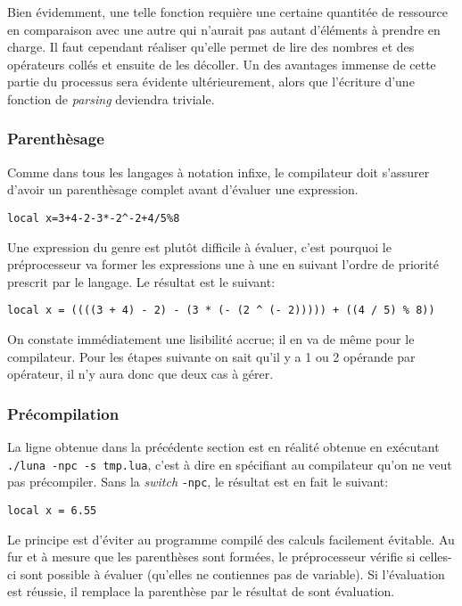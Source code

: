 \documentclass{article}
\begin{document}
Bien évidemment, une telle fonction requière une certaine quantitée de ressource en comparaison avec une autre qui n'aurait pas autant d'éléments à prendre en charge. Il faut cependant réaliser qu'elle permet de lire des nombres et des opérateurs collés et ensuite de les décoller. Un des avantages immense de cette partie du processus sera évidente ultérieurement, alors que l'écriture d'une fonction de \textit{parsing} deviendra triviale.

\subsubsection{Parenthèsage}
Comme dans tous les langages à notation infixe, le compilateur doit s'assurer d'avoir un parenthèsage complet avant d'évaluer une expression.
\begin{lstlisting}[caption={Parenthèsage incomplet},label=DescriptiveLabel]
  local x=3+4-2-3*-2^-2+4/5%8
\end{lstlisting}

Une expression du genre est plutôt difficile à évaluer, c'est pourquoi le préprocesseur va former les expressions une à une en suivant l'ordre de priorité prescrit par le langage. Le résultat est le suivant:
\begin{lstlisting}[belowcaptionskip = -1\baselineskip]
local x = ((((3 + 4) - 2) - (3 * (- (2 ^ (- 2))))) + ((4 / 5) % 8))
\end{lstlisting}

On constate immédiatement une lisibilité accrue; il en va de même pour le compilateur. Pour les étapes suivante on sait qu'il y a 1 ou 2 opérande par opérateur, il n'y aura donc que deux cas à gérer.
\subsubsection{Précompilation}
La ligne obtenue dans la précédente section est en réalité obtenue en exécutant \texttt{./luna -npc -s tmp.lua}, c'est à dire en spécifiant au compilateur qu'on ne veut pas précompiler. Sans la \textit{switch} \texttt{-npc}, le résultat est en fait le suivant:
\begin{lstlisting}[belowcaptionskip = -1\baselineskip]
local x = 6.55
\end{lstlisting}


Le principe est d'éviter au programme compilé des calculs facilement évitable. Au fur et à mesure que les parenthèses sont formées, le préprocesseur vérifie si celles-ci sont possible à évaluer (qu'elles ne contiennes pas de variable). Si l'évaluation est réussie, il remplace la parenthèse par le résultat de sont évaluation.
\end{document}
